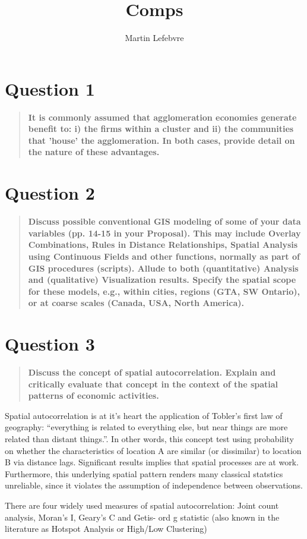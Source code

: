 \documentclass[12pt,letterpaper,notitlepage,onecolumn,final,openbib]{article}
\author{Martin Lefebvre}
\title{Comps}
\begin{document}
	
\section{Question 1}
\begin{quotation}
\textbf{It is commonly assumed that agglomeration economies generate benefit to: i) the firms within a cluster and ii) the communities that 'house' the agglomeration. In both cases, provide detail on the nature of these advantages.}
\end{quotation}
\section{Question 2}
\begin{quotation}
\textbf{Discuss possible conventional GIS modeling of some of your data variables (pp. 14-15 in your Proposal). This may include Overlay Combinations, Rules in Distance Relationships, Spatial Analysis using Continuous Fields and other functions, normally as part of GIS procedures (scripts). Allude to both (quantitative) Analysis and (qualitative) Visualization results. Specify the spatial scope for these models, e.g., within cities, regions (GTA, SW Ontario), or at coarse scales (Canada, USA, North America).}
\end{quotation}
\section{Question 3}
\begin{quotation}
\textbf{Discuss the concept of spatial autocorrelation. Explain and critically evaluate that concept in the context of the spatial patterns of economic activities.}
\end{quotation}

Spatial autocorrelation is at it's heart the application of Tobler's first law of geography: ``everything is related to everything else, but near things are more related than distant things.''\cite[page  236]{toblera1970}.  In other words, this concept test using probability on whether the characteristics of location A are similar (or dissimilar) to location B via distance lags.   Significant results implies that spatial processes are at work.  Furthermore, this underlying spatial pattern renders many classical statstics unreliable, since it violates the assumption of independence between observations. 

There are four widely used measures of spatial autocorrelation: Joint count analysis, Moran's I, Geary's C and Getis- ord g statistic (also known in the literature as Hotspot Analysis or High/Low Clustering)
\end{document}
